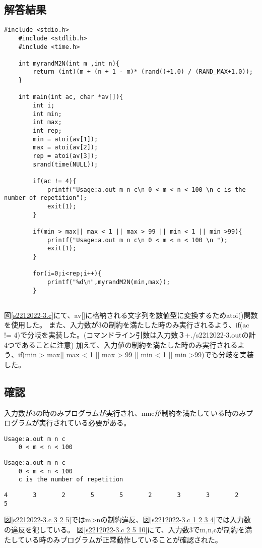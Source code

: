 \documentclass[fontsize = 10pt, paper= a4]{jlreq}
\begin{document}
\subsection{解答結果}
\begin{lstlisting}[basicstyle=\ttfamily\footnotesize, frame=single,  caption=s2212022-3.c ,label=s2212022-3.c]
    #include <stdio.h>
    #include <stdlib.h>
    #include <time.h>
    
    int myrandM2N(int m ,int n){
        return (int)(m + (n + 1 - m)* (rand()+1.0) / (RAND_MAX+1.0));
    }
    
    int main(int ac, char *av[]){
        int i;
        int min;
        int max;
        int rep;
        min = atoi(av[1]);
        max = atoi(av[2]);
        rep = atoi(av[3]);
        srand(time(NULL));
    
        if(ac != 4){
            printf("Usage:a.out m n c\n 0 < m < n < 100 \n c is the number of repetition");
            exit(1);
        }
    
        if(min > max|| max < 1 || max > 99 || min < 1 || min >99){
            printf("Usage:a.out m n c\n 0 < m < n < 100 \n ");
            exit(1);
        }
    
        for(i=0;i<rep;i++){
            printf("%d\n",myrandM2N(min,max));
        }
    
\end{lstlisting}
図\ref{s2212022-3.c}にて、av[]に格納される文字列を数値型に変換するためatoi()関数を使用した。
また、入力数が3の制約を満たした時のみ実行されるよう、if(ac != 4)で分岐を実装した。(コマンドライン引数は入力数３+./s2212022-3.outの計4つであることに注意)
加えて、入力値の制約を満たした時のみ実行されるよう、if(min > max|| max < 1 || max > 99 || min < 1 || min >99)でも分岐を実装した。
\subsection{確認}
入力数が3の時のみプログラムが実行され、mncが制約を満たしている時のみプログラムが実行されている必要がある。
\begin{lstlisting}[basicstyle=\ttfamily\footnotesize, frame=single, caption=s2212022-3.out 3 2 5 ,label=s2212022-3.c 3 2 5]
    Usage:a.out m n c
    0 < m < n < 100   
\end{lstlisting}
\begin{lstlisting}[basicstyle=\ttfamily\footnotesize, frame=single, caption=s2212022-3.out 1 2 3 4 ,label=s2212022-3.c 1 2 3 4]
    Usage:a.out m n c
    0 < m < n < 100
    c is the number of repetition
\end{lstlisting}
\begin{lstlisting}[basicstyle=\ttfamily\footnotesize, frame=single, caption=s2212022-3.out 2 5 10 ,label=s2212022-3.c 2 5 10]
    4       3       2       5       5       2       3       3       2       5        
\end{lstlisting}
図\ref{s2212022-3.c 3 2 5}ではm>nの制約違反、図\ref{s2212022-3.c 1 2 3 4}では入力数の違反を犯している。
図\ref{s2212022-3.c 2 5 10}にて、入力数3でm,n,cが制約を満たしている時のみプログラムが正常動作していることが確認された。
\end{document}
